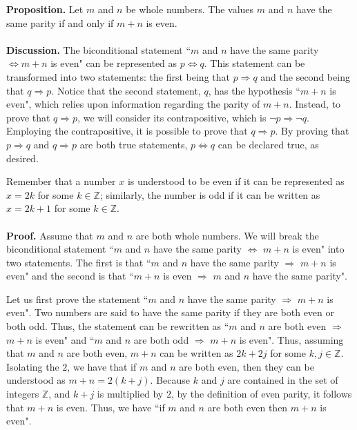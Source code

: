 \documentclass[12pt]{exam}
\begin{document}
\begin{questions}
\question
\textbf{Proposition.} Let $m$ and $n$ be whole numbers. The values $m$ and $n$ have the same parity if and only if $m+n$ is even.
\\
\\\textbf{Discussion.} The biconditional statement ``$m$ and $n$ have the same parity $\Leftrightarrow m+n$ is even" can be represented as $p\Leftrightarrow q$. This statement can be transformed into two statements: the first being that $p\Rightarrow q$ and the second being that $q\Rightarrow p$. Notice that the second statement, $q$, has the hypothesis ``$m+n$ is even", which relies upon information regarding the parity of $m+n$. Instead, to prove that $q\Rightarrow p$, we will consider its contrapositive, which is $\neg p \Rightarrow \neg q$. Employing the contrapositive, it is possible to prove that  $q\Rightarrow p$. By proving that $p\Rightarrow q$ and $q\Rightarrow p$ are both true statements, $p\Leftrightarrow q$ can be declared true, as desired. 
\par
Remember that a number $x$ is understood to be even if it can be represented as $x=2k$ for some $k \in \mathbb Z$; similarly, the number is odd if it can be written as $x=2k+1$ for some  $k \in \mathbb Z$.\\
\\\textbf{Proof.} Assume that $m$ and $n$ are both whole numbers. We will break the biconditional statement ``$m$ and $n$ have the same parity $\Leftrightarrow$  $m+n$ is even" into two statements. The first is that  ``$m$ and $n$ have the same parity $\Rightarrow$ $m+n$ is even" and the second is that ``$m+n$ is even $\Rightarrow$ $m$ and $n$ have the same parity".
\par 
Let us first prove the statement ``$m$ and $n$ have the same parity $\Rightarrow$  $m+n$ is even". Two numbers are said to have the same parity if they are both even or both odd. Thus, the statement can be rewritten as ``$m$ and $n$ are both even $\Rightarrow$  $m+n$ is even" and ``$m$ and $n$ are both odd $\Rightarrow$ $m+n$ is even".  Thus, assuming that $m$ and $n$ are both even, $m+n$ can be written as $2k+2j$ for some $k,j \in \mathbb Z$. Isolating the $2$, we have that if $m$ and $n$ are both even, then they can be understood as $m+n = 2(k+j)$. Because $k$ and $j$ are contained in the set of integers $\mathbb Z$, and $k+j$ is multiplied by $2$, by the definition of even parity, it follows that $m+n$ is even. Thus, we have ``if $m$ and $n$ are both even then  $m+n$ is even". 
\par

\end{questions}
\end{document}
